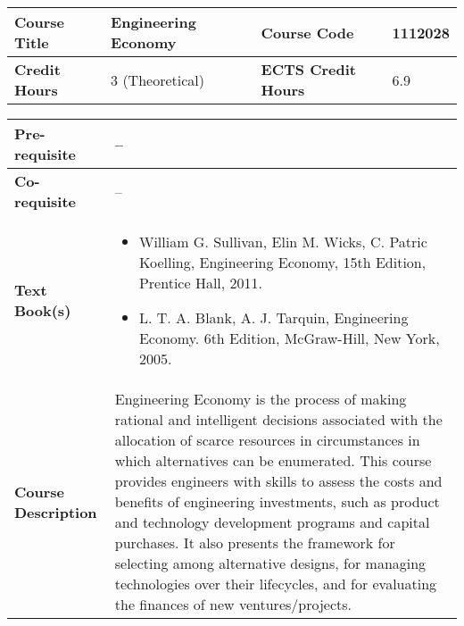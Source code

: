 \documentclass[12pt]{article}
\begin{document}
\begin{minipage}{\textwidth}
\begin{tabularx}{\textwidth}{|l|X|l|X|}
\hline
\textbf{Course Title}       &   Engineering Economy & \textbf{Course Code}       &  1112028 \\ \hline
\textbf{Credit Hours}       &  3 (Theoretical) & \textbf{ECTS Credit Hours}       &  6.9 \\ \hline
\end{tabularx}

\begin{tabularx}{\textwidth}{|l|X|}
\hline
\textbf{Pre-requisite}      &  -- \\ \hline
\textbf{Co-requisite}       &  -- \\ \hline
\textbf{Text Book(s)}      & \begin{minipage}{.70\textwidth}
					\begin{itemize} \itemsep-0.4em
						\vspace{3mm}
						\item William G. Sullivan, Elin M. Wicks, C. Patric Koelling, Engineering Economy, 15th Edition, Prentice Hall, 2011.
						\item L. T. A. Blank, A. J. Tarquin, Engineering Economy. 6th Edition, McGraw-Hill, New York, 2005.
						\vspace{3mm}
					\end{itemize}
				\end{minipage}  \\ \hline
\textbf{Course Description} & \begin{minipage}{.70\textwidth}
					\vspace{3mm}
					Engineering Economy is the process of making rational and intelligent decisions associated with the allocation of
					scarce resources in circumstances in which alternatives can be enumerated. This course provides engineers with
					skills to assess the costs and benefits of engineering investments, such as product and technology development
					programs and capital purchases. It also presents the framework for selecting among alternative designs, for
					managing technologies over their lifecycles, and for evaluating the finances of new ventures/projects.

					\vspace{3mm}
					\end{minipage} \\ \hline
\end{tabularx}
\end{minipage}
\end{document}
